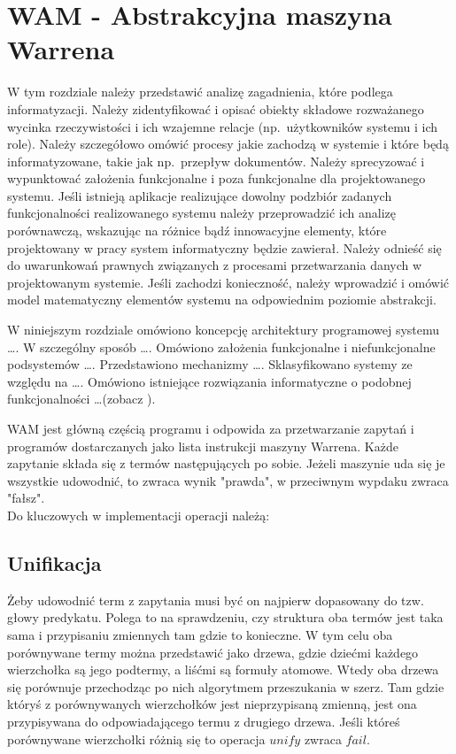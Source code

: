 \chapter{WAM - Abstrakcyjna maszyna Warrena}
\thispagestyle{chapterBeginStyle}

\iffalse
W tym rozdziale należy przedstawić analizę zagadnienia, które podlega informatyzacji. Należy zidentyfikować i opisać obiekty składowe rozważanego wycinka rzeczywistości i ich wzajemne relacje (np.\ użytkowników systemu i ich role). Należy szczegółowo omówić procesy jakie zachodzą w systemie i które będą informatyzowane, takie jak np.\ przepływ dokumentów.
Należy sprecyzować i wypunktować założenia funkcjonalne i poza funkcjonalne dla projektowanego systemu.
Jeśli istnieją aplikacje realizujące dowolny podzbiór zadanych funkcjonalności realizowanego systemu należy przeprowadzić ich analizę porównawczą, wskazując na różnice bądź innowacyjne elementy, które projektowany w pracy system informatyczny będzie zawierał.
Należy odnieść się do uwarunkowań prawnych związanych z procesami przetwarzania danych w projektowanym systemie.
Jeśli zachodzi konieczność, należy wprowadzić i omówić model matematyczny elementów systemu na odpowiednim poziomie abstrakcji.

{\color{dgray}
W niniejszym rozdziale omówiono koncepcję architektury programowej systemu \ldots. W
szczególny sposób \ldots. Omówiono założenia funkcjonalne i niefunkcjonalne podsystemów \ldots. Przedstawiono
mechanizmy \ldots. Sklasyfikowano systemy ze względu na \ldots. Omówiono istniejące rozwiązania informatyczne o podobnej funkcjonalności \ldots (zobacz \cite{JCINodesChord}).
}


WAM jest główną częścią programu i odpowida za przetwarzanie zapytań i programów dostarczanych jako lista instrukcji maszyny Warrena. Każde zapytanie składa się z termów następujących po sobie. Jeżeli maszynie uda się je wszystkie udowodnić, to zwraca wynik "prawda", w przeciwnym wypdaku zwraca "fałsz".\\
Do kluczowych w implementacji operacji należą:\\

\section{Unifikacja}

Żeby udowodnić term z zapytania musi być on najpierw dopasowany do tzw. głowy predykatu. Polega to na sprawdzeniu, czy struktura oba termów jest taka sama i przypisaniu zmiennych tam gdzie to konieczne. W tym celu oba porównywane termy można przedstawić jako drzewa, gdzie dziećmi każdego wierzchołka są jego podtermy, a liśćmi są formuły atomowe. Wtedy oba drzewa się porównuje przechodząc po nich algorytmem przeszukania w szerz. Tam gdzie któryś z porównywanych wierzchołków jest nieprzypisaną zmienną, jest ona przypisywana do odpowiadającego termu z drugiego drzewa. Jeśli któreś porównywane wierzchołki różnią się to operacja $unify$ zwraca $fail$.

